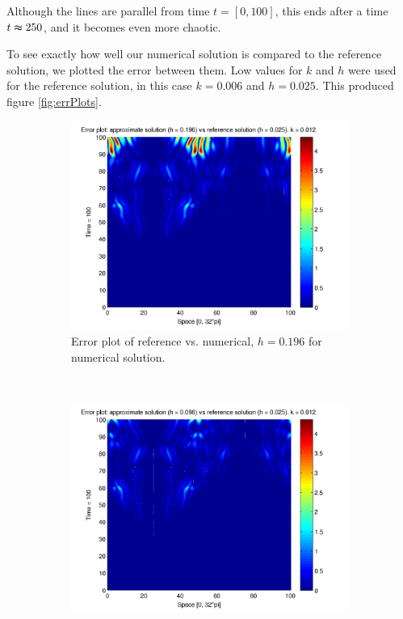 Although the lines are parallel from time $t = [0,100]$, this ends after a time $t \thickapprox 250$, and it becomes even more chaotic.

To see exactly how well our numerical solution is compared to the reference solution, we plotted the error between them. Low values for $k$ and $h$ were used for the reference solution, in this case $k = 0.006$ and $h = 0.025$. This produced figure \ref{fig:errPlots}.

\begin{figure}[H]
        \centering
        \begin{subfigure}[b]{0.52\textwidth}
                \includegraphics[width=\textwidth]{../PDFs/IMEX/errPlots_worst_scaled.pdf}
                \caption{Error plot of reference vs. numerical, $h = 0.196$ for numerical solution.}
                \label{fig:highError}
        \end{subfigure}%
        ~ %
        \begin{subfigure}[b]{0.52\textwidth}
                \includegraphics[width=\textwidth]{../PDFs/IMEX/errPlots_best_scaled.pdf}

\end{subfigure}
\end{figure}
